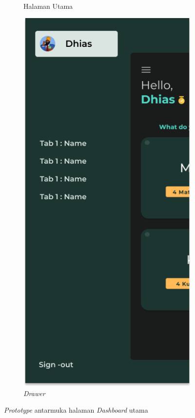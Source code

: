 \begin{figure}[H]
\begin{subfigure}[b]{0.24\textwidth}
	  \caption{Halaman Utama}
	  \label{fig:HasilMainDash-dark}
	\end{subfigure}
    \begin{subfigure}[b]{0.24\textwidth}
		\centering
	  \includegraphics[width=\linewidth]{contents/chapter-3/images/HF-Drawer-dt.png}
	  \caption{\textit{Drawer}}
	  \label{fig:HasilMainDash2-dark}
	\end{subfigure}
	\caption{\textit{Prototype} antarmuka halaman \textit{Dashboard} utama}
	\label{Fig:HasilFeatureDashboard}
\end{figure} 


